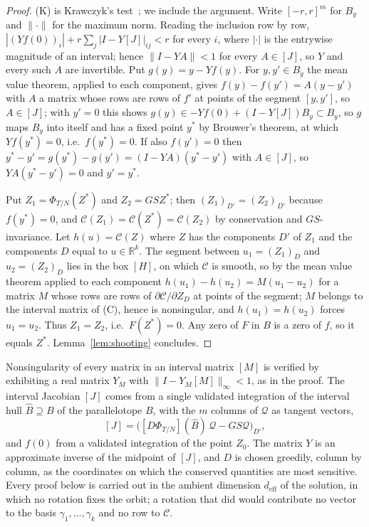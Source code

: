 \documentclass[11pt]{amsart}
\theoremstyle{definition}
\newcommand{\R}{\mathbb{R}}
\newcommand{\intv}[1]{[#1]}
\newcommand{\deff}{d_{\mathrm{eff}}}
\begin{document}
\begin{proof}
(K) is Krawczyk's test~\cite{Krawczyk1969,Neumaier1990,Tucker2011}; we include the argument. Write $[-r,r]^m$ for $B_y$ and $\|\cdot\|$ for the maximum norm. Reading the inclusion row by row, $|(Yf(0))_i|+r\sum_j|I-Y\intv{J}|_{ij}<r$ for every $i$, where $|\cdot|$ is the entrywise magnitude of an interval; hence $\|I-YA\|<1$ for every $A\in\intv{J}$, so $Y$ and every such $A$ are invertible. Put $g(y)=y-Yf(y)$. For $y,y'\in B_y$ the mean value theorem, applied to each component, gives $f(y)-f(y')=A(y-y')$ with $A$ a matrix whose rows are rows of $f'$ at points of the segment $[y,y']$, so $A\in\intv{J}$; with $y'=0$ this shows $g(y)\in-Yf(0)+(I-Y\intv{J})B_y\subset B_y$, so $g$ maps $B_y$ into itself and has a fixed point $y^*$ by Brouwer's theorem, at which $Yf(y^*)=0$, i.e.\ $f(y^*)=0$. If also $f(y')=0$ then $y^*-y'=g(y^*)-g(y')=(I-YA)(y^*-y')$ with $A\in\intv{J}$, so $YA(y^*-y')=0$ and $y'=y^*$.

Put $Z_1=\Phi_{T/N}(Z^*)$ and $Z_2=GSZ^*$; then $(Z_1)_{D'}=(Z_2)_{D'}$ because $f(y^*)=0$, and $\mathcal C(Z_1)=\mathcal C(Z^*)=\mathcal C(Z_2)$ by conservation and $GS$-invariance. Let $h(u)=\mathcal C(Z)$ where $Z$ has the components $D'$ of $Z_1$ and the components $D$ equal to $u\in\R^k$. The segment between $u_1=(Z_1)_D$ and $u_2=(Z_2)_D$ lies in the box $\intv{H}$, on which $\mathcal C$ is smooth, so by the mean value theorem applied to each component $h(u_1)-h(u_2)=M(u_1-u_2)$ for a matrix $M$ whose rows are rows of $\partial\mathcal C/\partial Z_D$ at points of the segment; $M$ belongs to the interval matrix of (C), hence is nonsingular, and $h(u_1)=h(u_2)$ forces $u_1=u_2$. Thus $Z_1=Z_2$, i.e.\ $F(Z^*)=0$. Any zero of $F$ in $B$ is a zero of $f$, so it equals $Z^*$. Lemma~\ref{lem:shooting} concludes.
\end{proof}

Nonsingularity of every matrix in an interval matrix $\intv{M}$ is verified by exhibiting a real matrix $Y_M$ with $\|I-Y_M\intv{M}\|_\infty<1$, as in the proof. The interval Jacobian $\intv{J}$ comes from a single validated integration of the interval hull $\hat B\supseteq B$ of the parallelotope $B$, with the $m$ columns of $\mathcal Q$ as tangent vectors,
\[
\intv{J}=\big(\intv{D\Phi_{T/N}}(\hat B)\,\mathcal Q-GS\mathcal Q\big)_{D'},
\]
and $f(0)$ from a validated integration of the point $Z_0$. The matrix $Y$ is an approximate inverse of the midpoint of $\intv{J}$, and $D$ is chosen greedily, column by column, as the coordinates on which the conserved quantities are most sensitive. Every proof below is carried out in the ambient dimension $\deff$ of the solution, in which no rotation fixes the orbit; a rotation that did would contribute no vector to the basis $\gamma_1,\dots,\gamma_k$ and no row to $\mathcal C$.
\end{document}

